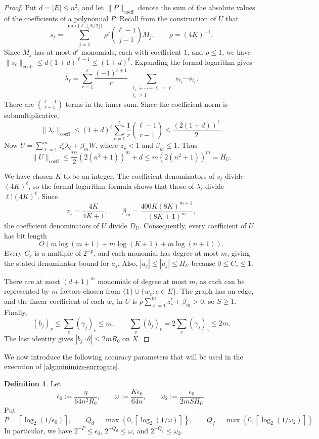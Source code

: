 \documentclass[11pt,reqno,letterpaper]{amsart}
\numberwithin{equation}{section}
\theoremstyle{definition}
\newtheorem{definition}[definition]{Definition}
\theoremstyle{remark}
\begin{document}
\begin{proof}
Put $d=|E|\le n^2$, and let $\|P\|_{\mathrm{coeff}}$ denote
the sum of the absolute values of the coefficients of a
polynomial $P$. Recall from the construction of $U$ that
\[
 s_\ell=\sum_{j=1}^{\min\{\ell,\lfloor N/2\rfloor\}}
 \rho^j\binom{\ell-1}{j-1}M_j,\qquad \rho=(4K)^{-1}.
\]
Since $M_j$ has at most $d^j$ monomials, each with coefficient
$1$, and $\rho\le1$, we have
$\|s_\ell\|_{\mathrm{coeff}}
 \le d(1+d)^{\ell-1}\le(1+d)^\ell$.
Expanding the formal logarithm gives
\[
 \lambda_\ell=
 \sum_{r=1}^{\ell}\frac{(-1)^{r+1}}r
 \sum_{\substack{\ell_1+\cdots+\ell_r=\ell\\\ell_i\ge1}}
 s_{\ell_1}\cdots s_{\ell_r}.
\]
There are $\binom{\ell-1}{r-1}$ terms in the inner sum.
Since the coefficient norm is submultiplicative,
\[
 \|\lambda_\ell\|_{\mathrm{coeff}}
 \le(1+d)^\ell
       \sum_{r=1}^{\ell}\frac1r\binom{\ell-1}{r-1}
 \le\frac{(2(1+d))^\ell}{2}.
\]
Now
$U=\sum_{\ell=1}^m z_\star^\ell\lambda_\ell+\beta_mW$,
where $z_\star<1$ and $\beta_m\le1$. Thus
\[
 \|U\|_{\mathrm{coeff}}
 \le\frac m2(2(n^2+1))^m+d
 \le m(2(n^2+1))^m=H_U.
\]

We have chosen $K$ to be an integer. The coefficient
denominators of $s_\ell$ divide $(4K)^\ell$, so the
formal logarithm formula shows that those of $\lambda_\ell$
divide $\ell!(4K)^\ell$. Since
\[
 z_\star=\frac{4K}{4K+1},\qquad
 \beta_m=\frac{400K(8K)^{m+1}}{(8K+1)^m},
\]
the coefficient denominators of $U$ divide $D_U$.
Consequently, every coefficient of $U$ has bit length
\[
 O\!\left(m\log(m+1)+m\log(K+1)+m\log(n+1)\right).
\]
Every $C_e$ is a multiple of $2^{-p}$, and each monomial
has degree at most $m$, giving the stated denominator
bound for $a_j$. Also, $|a_j|\le|u_j|\le H_U$ because
$0\le C_e\le1$.

There are at most $(d+1)^m$ monomials of degree at most $m$, as
each can be represented by $m$ factors chosen from
$\{1\}\cup\{w_e:e\in E\}$.
The graph has an edge, and the linear coefficient of each
$w_e$ in $U$ is
$\rho\sum_{\ell=1}^m z_\star^\ell+\beta_m>0$, so $S\ge1$.
Finally,
\[
 (b_j)_v\le\sum_e(\gamma_j)_e\le m,\qquad
 \sum_v(b_j)_v=2\sum_e(\gamma_j)_e\le2m.
\]
The last identity gives $|b_j\cdot\theta|\le2mR_0$ on $X$.
\end{proof}

We now introduce the following accuracy parameters that will be used in the execution of \cref{alg:minimize-surrogate}.

\begin{definition}\label{def:PQdQf}
    Let 
\[
\epsilon_0:=\frac{\eta}{64n^2R_0},\qquad \omega:=\frac{K\epsilon_0}{64n},\qquad \omega_2:=\frac{\epsilon_0}{2mSH_U}.
\]
Put
\[
 P=\left\lceil\log_2(1/\epsilon_0)\right\rceil,\qquad
 Q_d=\max\left\{0,\left\lceil\log_2(1/\omega)\right\rceil\right\},
 \qquad
 Q_f=\max\left\{0,\left\lceil\log_2(1/\omega_2)\right\rceil\right\}.
\]
In particular, we have $2^{-P}\leq\epsilon_0$,
$2^{-Q_d}\leq\omega$, and $2^{-Q_f}\leq\omega_2$. 
 
\end{definition}
\end{document}
